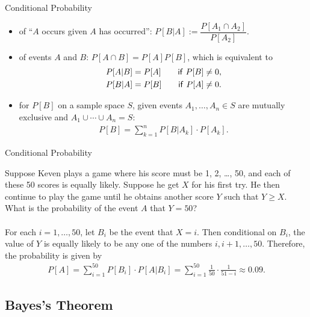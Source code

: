 \begin{frame}{Conditional Probability}

\begin{itemize}
	\justifying
	\item {} of ``$A$ occurs given $A$ has occurred'': $P[B|A] := \dfrac{P[A_1\cap A_2]}{P[A_2]}$.
	\item {} of events $A$ and $B$: $P[A\cap B] = P[A]P[B]$, which is equivalent to
	\begin{align*}
	P[A|B] = P[A] \qquad \mathsf{if}\ P[B]\neq 0, \\
	P[B|A] = P[B] \qquad \mathsf{if}\ P[A]\neq 0.
	\end{align*}
	\item {} for $P[B]$ on a sample space $S$, given events $A_1, \ldots, A_n \in S$ are mutually exclusive and $A_1\cup\cdots\cup A_n = S$:
	\begin{align*}
	P[B] = \sum_{k=1}^{n} P[B|A_k]\cdot P[A_k].
	\end{align*}
\end{itemize}

\end{frame}

\begin{frame}{Conditional Probability}

\justifying
{} Suppose Keven plays a game where his score must be 1, 2, \ldots, 50, and each of these 50 scores is equally likely. Suppose he get $X$ for his first try. He then continue to play the game until he obtains another score $Y$ such that $Y\geq X$. What is the probability of the event $A$ that $Y = 50$?
~\\
~\\
\pause
\justifying
{} For each $i = 1, \ldots, 50$, let $B_i$ be the event that $X = i$. Then conditional on $B_i$, the value of $Y$ is equally likely to be any one of the numbers $i, i + 1, \ldots, 50$. Therefore, the probability is given by
\begin{align*}
P[A] = \sum_{i=1}^{50} P[B_i]\cdot P[A|B_i] = \sum_{i=1}^{50} \frac{1}{50}\cdot \frac{1}{51-i} \approx 0.09.
\end{align*}

\end{frame}


\subsection{Bayes's Theorem}

